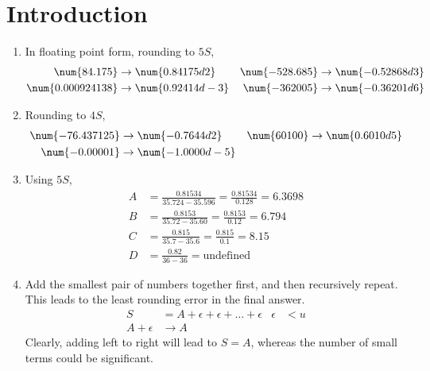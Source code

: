 \section{Introduction}

\begin{enumerate}
    \item In floating point form, rounding to $ 5S $,
          \begin{align}
              \num{84.175}      & \to \num{0.84175d2}  &
              \num{-528.685}    & \to \num{-0.52868d3}   \\
              \num{0.000924138} & \to \num{0.92414d-3} &
              \num{-362005}     & \to \num{-0.36201d6}
          \end{align}

    \item Rounding to $ 4S $,
          \begin{align}
              \num{-76.437125} & \to \num{-0.7644d2}  &
              \num{60100}      & \to \num{0.6010d5}     \\
              \num{-0.00001}   & \to \num{-1.0000d-5}
          \end{align}

    \item Using $ 5S $,
          \begin{align}
              A & = \frac{0.81534}{35.724 - 35.596} = \frac{0.81534}{0.128}
              = 6.3698                                                      \\
              B & = \frac{0.8153}{35.72 - 35.60} = \frac{0.8153}{0.12}
              = 6.794                                                       \\
              C & = \frac{0.815}{35.7 - 35.6} = \frac{0.815}{0.1}
              = 8.15                                                        \\
              D & = \frac{0.82}{36 - 36} = \text{undefined}
          \end{align}

    \item Add the smallest pair of numbers together first, and then recursively
          repeat. This leads to the least rounding error in the final answer.
          \begin{align}
              S            & = A + \epsilon + \epsilon + \dots + \epsilon &
              \epsilon     & < u                                            \\
              A + \epsilon & \to A
          \end{align}
          Clearly, adding left to right will lead to $ S = A $, whereas the number of
          small terms could be significant.


\end{enumerate}
